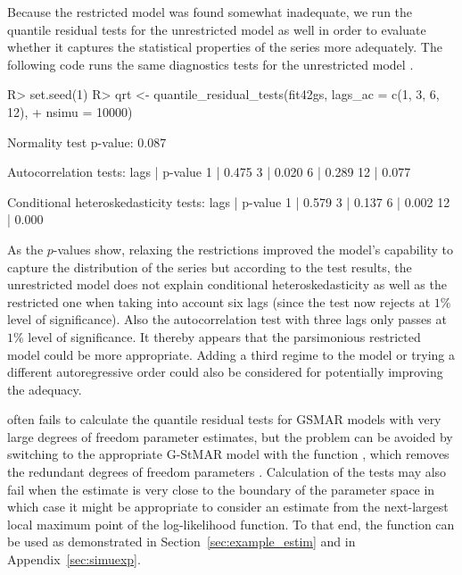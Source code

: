 \documentclass[nojss]{jss} %
\begin{document}
Because the restricted model was found somewhat inadequate, we run the quantile residual tests for the unrestricted model as well in order to evaluate whether it captures the statistical properties of the series more adequately. The following code runs the same diagnostics tests for the unrestricted model .
%
\begin{CodeChunk}
\begin{CodeInput}
R> set.seed(1)
R> qrt <- quantile_residual_tests(fit42gs, lags_ac = c(1, 3, 6, 12),
+    nsimu = 10000)
\end{CodeInput}
\begin{CodeOutput}
Normality test p-value: 0.087

Autocorrelation tests:
lags | p-value
  1  |  0.475
  3  |  0.020
  6  |  0.289
  12 |  0.077

Conditional heteroskedasticity tests:
lags | p-value
  1  |  0.579
  3  |  0.137
  6  |  0.002
  12 |  0.000
\end{CodeOutput}
\end{CodeChunk}
%
As the $p$-values show, relaxing the restrictions improved the model's capability to capture the distribution of the series but according to the test results, the unrestricted model does not explain conditional heteroskedasticity as well as the restricted one when taking into account six lags (since the test now rejects at $1\%$ level of significance). Also the autocorrelation test with three lags only passes at $1\%$ level of significance. It thereby appears that the parsimonious restricted model could be more appropriate. Adding a third regime to the model or trying a different autoregressive order could also be considered for potentially improving the adequacy.

 often fails to calculate the quantile residual tests for GSMAR models with very large degrees of freedom parameter estimates, but the problem can be avoided by switching to the appropriate G-StMAR model with the function , which removes the redundant degrees of freedom parameters \citep[see][Section 4, and Section~\ref{sec:example_estim} of this paper]{Virolainen:2020}. Calculation of the tests may also fail when the estimate is very close to the boundary of the parameter space in which case it might be appropriate to consider an estimate from the next-largest local maximum point of the log-likelihood function. To that end, the function  can be used as demonstrated in Section~\ref{sec:example_estim} and in Appendix~\ref{sec:simuexp}.
\end{document}
